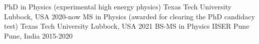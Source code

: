 \begin{cvhonors}
  \cvhonor
    {PhD in Physics (experimental high energy physics)} %
    {Texas Tech University} %
    {Lubbock, USA} %
    {2020-now} %
  \cvhonor
    {MS in Physics (awarded for clearing the PhD candidacy test)} %
    {Texas Tech University} %
    {Lubbock, USA} %
    {2021} %
  \cvhonor
    {BS-MS in Physics} %
    {IISER Pune} %
    {Pune, India} %
    {2015-2020} %
\end{cvhonors}
